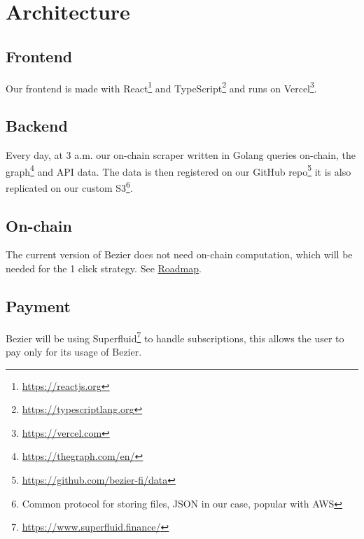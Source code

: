 \documentclass{article}
\begin{document}
\section{Architecture}
\subsection{Frontend}
Our frontend is made with React\footnote{\url{https://reactjs.org}} and TypeScript\footnote{\url{https://typescriptlang.org}} and runs on Vercel\footnote{\url{https://vercel.com}}.
\subsection{Backend}
Every day, at 3 a.m. our on-chain scraper written in Golang queries on-chain, the graph\footnote{\url{https://thegraph.com/en/}} and API data. The data is then registered on our GitHub repo\footnote{\url{https://github.com/bezier-fi/data}} it is also replicated on our custom S3\footnote{Common protocol for storing files, JSON in our case, popular with AWS}.
\subsection{On-chain}
The current version of Bezier does not need on-chain computation, which will be needed for the 1 click strategy. See \hyperref[sec:roadmap]{Roadmap}.
\subsection{Payment}
Bezier will be using Superfluid\footnote{\url{https://www.superfluid.finance/}} to handle subscriptions, this allows the user to pay only for its usage of Bezier.
\pagebreak
\end{document}
